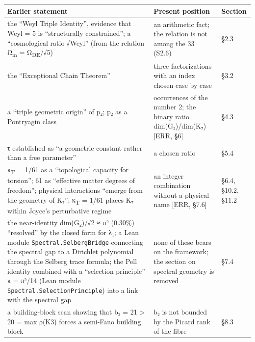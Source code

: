 \documentclass[11pt,a4paper]{article}
\begin{document}
\begin{longtable}[]{@{}
  >{\raggedright\arraybackslash}p{}
  >{\raggedright\arraybackslash}p{}
  >{\raggedright\arraybackslash}p{}@{}}
\toprule\noalign{}
\begin{minipage}[b]{\linewidth}\raggedright
Earlier statement
\end{minipage} & \begin{minipage}[b]{\linewidth}\raggedright
Present position
\end{minipage} & \begin{minipage}[b]{\linewidth}\raggedright
Section
\end{minipage} \\
\midrule\noalign{}
\endhead
\bottomrule\noalign{}
\endlastfoot
the ``Weyl Triple Identity'', evidence that Weyl = 5 is ``structurally constrained''; a ``cosmological ratio √Weyl'' (from the relation Ω\textsubscript{m} = Ω\textsubscript{DE}/√5) & an arithmetic fact; the relation is not among the 33 (S2.6) & §2.3 \\
the ``Exceptional Chain Theorem'' & three factorizations with an index chosen case by case & §3.2 \\
a ``triple geometric origin'' of p₂; p₂ as a Pontryagin class & occurrences of the number 2; the binary ratio dim(G₂)/dim(K₇) {[}ERR, §6{]} & §4.3 \\
τ established as ``a geometric constant rather than a free parameter'' & a chosen ratio & §5.4 \\
κ\textsubscript{T} = 1/61 as a ``topological capacity for torsion''; 61 as ``effective matter degrees of freedom''; physical interactions ``emerge from the geometry of K₇''; κ\textsubscript{T} = 1/61 places K₇ within Joyce's perturbative regime & an integer combination without a physical name {[}ERR, §7.6{]} & §6.4, §10.2, §11.2 \\
the near-identity dim(G₂)/√2 ≈ π² (0.30\%) ``resolved'' by the closed form for λ₁; a Lean module \texttt{Spectral.\allowbreak{}Selberg\allowbreak{}Bridge} connecting the spectral gap to a Dirichlet polynomial through the Selberg trace formula; the Pell identity combined with a ``selection principle'' κ = π²/14 (Lean module \texttt{Spectral.\allowbreak{}Selection\allowbreak{}Principle}) into a link with the spectral gap & none of these bears on the framework; the section on spectral geometry is removed & §7.4 \\
a building-block scan showing that b₂ = 21 \textgreater{} 20 = max ρ(K3) forces a semi-Fano building block & b₂ is not bounded by the Picard rank of the fibre & §8.3 \\

\end{longtable}
\end{document}
